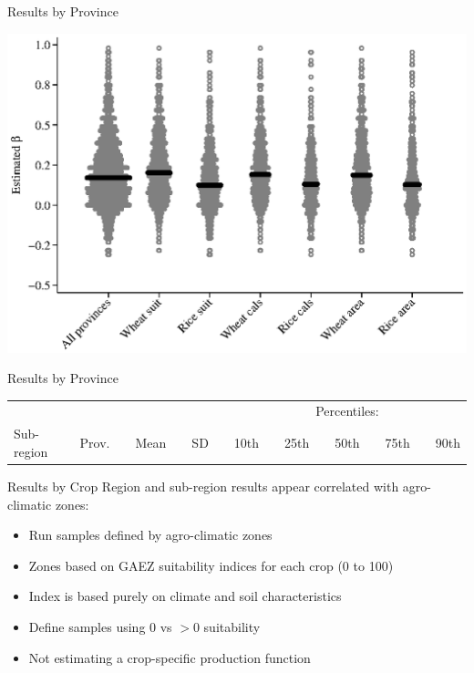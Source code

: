 \documentclass[10pt, xcolor=dvipsnames]{beamer}
\begin{document}
\begin{frame}{Results by Province}
\begin{center}
\includegraphics[width=.8\textwidth]{fig_beta_province.eps}
\end{center}
\end{frame}

\begin{frame}{Results by Province}

{\tiny
\begin{tabularx}{\textwidth}{lrXrXrXrXrXrXrXr}
\midrule
           &       &&      &&     && \multicolumn{9}{c}{Percentiles:} \\ \cmidrule{8-16}
Sub-region & Prov. && Mean && SD  && 10th    && 25th    && 50th && 75th && 90th \\
\midrule

\midrule
\end{tabularx}
}
\end{frame}

\begin{frame}{Results by Crop}
Region and sub-region results appear correlated with agro-climatic zones:
\begin{itemize}
  \item Run samples defined by agro-climatic zones
  \item Zones based on GAEZ suitability indices for each crop (0 to 100)
  \item Index is based purely on climate and soil characteristics
  \item Define samples using 0 vs $>0$ suitability
  \item Not estimating a crop-specific production function
\end{itemize}
\end{frame}
\end{document}
